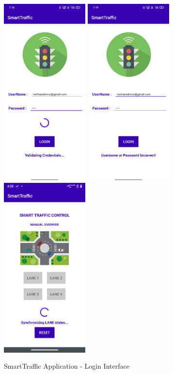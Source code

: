 \begin{figure}[h]\centering
	\includegraphics[width=1.75in]{./images/Login1.jpg}
        \includegraphics[width=1.75in]{./images/Login2.jpg}
        \includegraphics[width=1.75in]{./images/Login3.png}
	\caption{SmartTraffic Application - Login Interface}\label{Login}
\end{figure}

